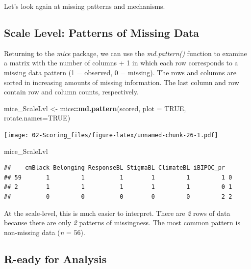 \documentclass[
  11pt,
]{book}
\newenvironment{Shaded}{\begin{snugshade}}{\end{snugshade}}
\newcommand{\AttributeTok}[1]{\textcolor[rgb]{0.27,0.27,0.27}{#1}}
\newcommand{\ConstantTok}[1]{\textcolor[rgb]{0.37,0.37,0.37}{#1}}
\newcommand{\FunctionTok}[1]{\textcolor[rgb]{0.27,0.27,0.27}{\textbf{#1}}}
\newcommand{\NormalTok}[1]{#1}
\newcommand{\OtherTok}[1]{\textcolor[rgb]{0.37,0.37,0.37}{#1}}
\newcommand{\SpecialCharTok}[1]{\textcolor[rgb]{0.43,0.43,0.43}{\textbf{#1}}}
\begin{document}
Let's look again at missing patterns and mechanisms.

\hypertarget{scale-level-patterns-of-missing-data}{%
\subsection{Scale Level: Patterns of Missing Data}\label{scale-level-patterns-of-missing-data}}

Returning to the \emph{mice} package, we can use the \emph{md.pattern()} function to examine a matrix with the number of columns + 1 in which each row corresponds to a missing data pattern (1 = observed, 0 = missing). The rows and columns are sorted in increasing amounts of missing information. The last column and row contain row and column counts, respectively.

\begin{Shaded}
\begin{Highlighting}[]
\NormalTok{mice\_ScaleLvl }\OtherTok{\textless{}{-}}\NormalTok{ mice}\SpecialCharTok{::}\FunctionTok{md.pattern}\NormalTok{(scored, }\AttributeTok{plot =} \ConstantTok{TRUE}\NormalTok{, }\AttributeTok{rotate.names=}\ConstantTok{TRUE}\NormalTok{)}
\end{Highlighting}
\end{Shaded}

\texttt{[image: 02-Scoring\_files/figure-latex/unnamed-chunk-26-1.pdf]}

\begin{Shaded}
\begin{Highlighting}[]
\NormalTok{mice\_ScaleLvl}
\end{Highlighting}
\end{Shaded}

\begin{verbatim}
##    cmBlack Belonging ResponseBL StigmaBL ClimateBL iBIPOC_pr  
## 59       1         1          1        1         1         1 0
## 2        1         1          1        1         1         0 1
##          0         0          0        0         0         2 2
\end{verbatim}

At the scale-level, this is much easier to interpret. There are \emph{2} rows of data because there are only \emph{2} patterns of missingness. The most common pattern is non-missing data (\emph{n} = 56).

\hypertarget{r-eady-for-analysis}{%
\subsection{R-eady for Analysis}\label{r-eady-for-analysis}}
\end{document}

